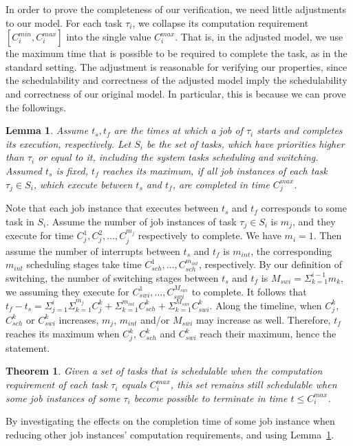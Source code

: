 \documentclass[10pt,journal]{IEEEtran}
\newtheorem{theorem}{Theorem}
\newtheorem{lemma}{Lemma}
\begin{document}
In order to prove the completeness of our verification, we need little
adjustments to our model.  For each task $\tau_i$, we collapse its
computation requirement $[C_i^{min},C_i^{max}]$ into the single value
$C_i^{max}$.  That is, in the adjusted model, we use the maximum time
that is possible to be required to complete the task, as in the
standard setting. The adjustment is reasonable for verifying our
properties, since the schedulability and correctness of the adjusted
model imply the schedulability and correctness of our original
model. In particular, this is because we can prove the followings.
\begin{lemma}
\label{l:max}
Assume $t_s, t_f$ are the times at which a job of $\tau_i$ starts and
completes its execution, respectively. Let $S_i$ be the set of tasks,
which have priorities higher than $\tau_i$ or equal to it, including
the system tasks scheduling and switching. Assumed $t_s$ is fixed,
$t_f$ reaches its maximum, if all job instances of each task
$\tau_j\in S_i$, which execute between $t_s$ and $t_f$, are completed
in time $C_j^{max}$.
\end{lemma}
\begin{IEEEproof} 
Note that each job instance that executes between $t_s$ and $t_f$
corresponds to some task in $S_i$. Assume the number of job instances
of task $\tau_j\in S_i$ is $m_j$, and they execute for time
$C_j^1,C_j^2,\ldots,C_j^{m_j}$ respectively to complete. We have
$m_i=1$. Then assume the number of interrupts between $t_s$ and $t_f$
is $m_{int}$, the corresponding $m_{int}$ scheduling stages take time
$C_{sch}^1,\ldots,C_{sch}^{m_{int}}$, respectively. By our definition
of switching, the number of switching stages between $t_s$ and $t_f$
is $M_{swi}=\Sigma_{k=1}^{i-1}m_k$, we assuming they execute for
$C_{swi}^1,\ldots,C_{swi}^{M_{swi}}$ to complete. It follows that
$t_f-t_s=\Sigma_{j=1}^i\Sigma_{k=1}^{m_j}C_j^k+\Sigma_{k=1}^{m_{int}}C_{sch}^k+\Sigma_{k=1}^{M_{swi}}C_{swi}^k$. Along
the timeline, when $C_j^k$, $C_{sch}^k$ or $C_{swi}^k$ increases,
$m_j$, $m_{int}$ and/or $M_{swi}$ may increase as well. Therefore,
$t_f$ reaches its maximum when $C_j^k$, $C_{sch}^k$ and $C_{swi}^k$
reach their maximum, hence the statement.
\end{IEEEproof}
\begin{theorem}
\label{th:max}
Given a set of tasks that is schedulable when the computation
requirement of each task $\tau_i$ equals $C_i^{max}$, this set remains
still schedulable when some job instances of some $\tau_i$ become
possible to terminate in time $t\le C_i^{max}$.
\end{theorem}
\begin{IEEEproof}
By investigating the effects on the completion time of some job
instance when reducing other job instances' computation requirements,
and using Lemma~\ref{l:max}.
\end{IEEEproof}
\end{document}
